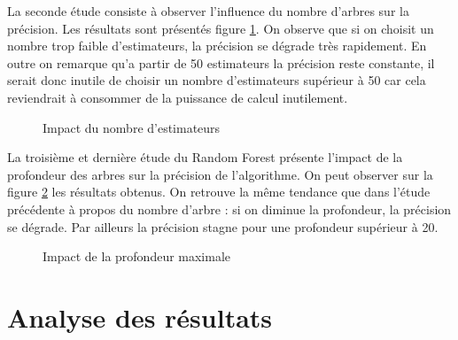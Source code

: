 \documentclass[11pt,a4paper]{article}
\begin{document}
			La seconde étude consiste à observer l'influence du nombre d'arbres sur la précision. Les résultats sont présentés figure \ref{rf_estimators}. On observe que si on choisit un nombre trop faible d'estimateurs, la précision se dégrade très rapidement. En outre on remarque qu'a partir de 50 estimateurs la précision reste constante, il serait donc inutile de choisir un nombre d'estimateurs supérieur à 50 car cela reviendrait à consommer de la puissance de calcul inutilement.

			\begin{figure}
				\caption{Impact du nombre d'estimateurs}
				\label{rf_estimators}
			\end{figure}


			La troisième et dernière étude du Random Forest présente l'impact de la profondeur des arbres sur la précision de l'algorithme. On peut observer sur la figure \ref{rf_depth} les résultats obtenus. On retrouve la même tendance que dans l'étude précédente à propos du nombre d'arbre : si on diminue la profondeur, la précision se dégrade. Par ailleurs la précision stagne pour une profondeur supérieur à 20.

			\begin{figure}
				\caption{Impact de la profondeur maximale}
				\label{rf_depth}
			\end{figure}

\section{Analyse des résultats}
\end{document}
